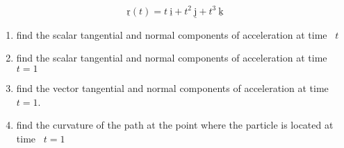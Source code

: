 \documentclass[12pt]{article}
\renewcommand{\vec}[1]{\underline{\mathrm{#1}}}
\begin{document}
\vspace{-\baselineskip}
$$\vec{r}(t)=t\ \vec{i} + t^2 \ \vec{j} + t^3 \ \vec{k}$$

\vspace{-\baselineskip}
\begin{enumerate}[label=(\alph*)]
   \item find the scalar tangential and normal components of acceleration at time \ $t$
   \item find the scalar tangential and normal components of acceleration at time \ $t=1$
   \item find the vector tangential and normal components of acceleration at time \ $t=1$.
   \item find the curvature of the path at the point where the particle is located at time \ $t=1$
\end{enumerate}
\end{document}
